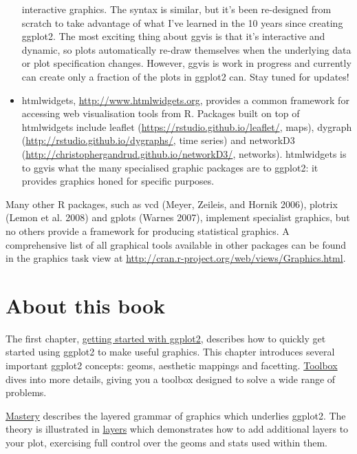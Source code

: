 \begin{itemize}
  interactive graphics. The syntax is similar, but it's been re-designed
  from scratch to take advantage of what I've learned in the 10 years
  since creating ggplot2. The most exciting thing about ggvis is that
  it's interactive and dynamic, so plots automatically re-draw
  themselves when the underlying data or plot specification changes.
  However, ggvis is work in progress and currently can create only a
  fraction of the plots in ggplot2 can. Stay tuned for updates!
\item
  htmlwidgets, \url{http://www.htmlwidgets.org}, provides a common
  framework for accessing web visualisation tools from R. Packages built
  on top of htmlwidgets include leaflet
  (\url{https://rstudio.github.io/leaflet/}, maps), dygraph
  (\url{http://rstudio.github.io/dygraphs/}, time series) and networkD3
  (\url{http://christophergandrud.github.io/networkD3/}, networks).
  htmlwidgets is to ggvis what the many specialised graphic packages are
  to ggplot2: it provides graphics honed for specific purposes.
\end{itemize}

Many other R packages, such as vcd (Meyer, Zeileis, and Hornik 2006),
plotrix (Lemon et al. 2008) and gplots (Warnes 2007), implement
specialist graphics, but no others provide a framework for producing
statistical graphics. A comprehensive list of all graphical tools
available in other packages can be found in the graphics task view at
\url{http://cran.r-project.org/web/views/Graphics.html}.

\hypertarget{about-this-book}{%
\section{About this book}\label{about-this-book}}

The first chapter, \protect\hyperlink{cha:getting-started}{getting
started with ggplot2}, describes how to quickly get started using
ggplot2 to make useful graphics. This chapter introduces several
important ggplot2 concepts: geoms, aesthetic mappings and facetting.
\protect\hyperlink{cha:toolbox}{Toolbox} dives into more details, giving
you a toolbox designed to solve a wide range of problems.

\protect\hyperlink{cha:mastery}{Mastery} describes the layered grammar
of graphics which underlies ggplot2. The theory is illustrated in
\protect\hyperlink{cha:layers}{layers} which demonstrates how to add
additional layers to your plot, exercising full control over the geoms
and stats used within them.

